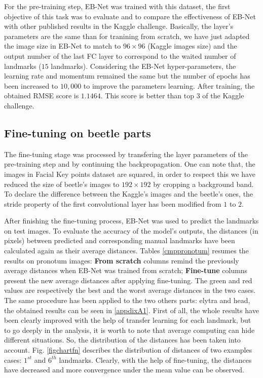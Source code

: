 \documentclass[review]{elsarticle}
\begin{document}
For the pre-training step, EB-Net was trained with this dataset,
the first objective of this task was to evaluate and to compare the
effectiveness of EB-Net with other published results in the
Kaggle challenge. Basically, the layer's parameters are the same than for
tranining from scratch, we have just adapted the image size in EB-Net
to match to $96 \times 96$ (Kaggle images size) and the output number of the last FC layer to
correspond to the waited number of landmarks ($15$
landmarks). Considering the EB-Net hyper-parameters, the learning rate and momentum remained the
same but the number of epochs has been increased to $10,000$ to improve the parameters learning. After training, the
obtained RMSE score is $1.1464$. This score is better than top $3$ of
the Kaggle challenge.

\subsection{Fine-tuning on beetle parts}
The fine-tuning stage was processed by transfering the layer parameters of
the pre-training step and by continuing the backpropagation. One can note that, the images in Facial Key points
dataset are squared, in order to respect this we have reduced the size
of beetle's images to $192 \times 192$ by cropping a background
band. To declare the difference between the Kaggle's images and the
beetle's ones, the stride property of the first convolutional
layer has been modified from $1$ to $2$.

After finishing the fine-tuning process, EB-Net was used to predict the
landmarks on test images. To evaluate the accuracy of the model's
outputs, the distances (in pixels) between predicted and corresponding
manual landmarks have been calculated again as their average
distances. Tables \ref{cmppronotum} resumes the results on pronotum
images: \textbf{From scratch} columns remind the previously average
distances when EB-Net was trained from scratch; \textbf{Fine-tune}
columns present the new average distances after applying
fine-tuning. The green and red values are respectively the best and
the worst average distances in the two cases. The same procedure has
been applied to the two others parts: elytra and head, the obtained results can be
seen in \ref{appdixA1}. First of all, the whole results have been clearly
improved with the help of transfer learning for each landmark, but to
go deeply in the analysis, it is worth to note that average computing can hide different situations. So, the distribution of the distances has been taken into
account. Fig. \ref{figchartfn} describes the distribution of distances
of two examples cases: $1^{st}$ and $6^{th}$ landmarks. Clearly, with
the help of fine-tuning, the distances have decreased and more
convergence under the mean value can be observed.
\end{document}
